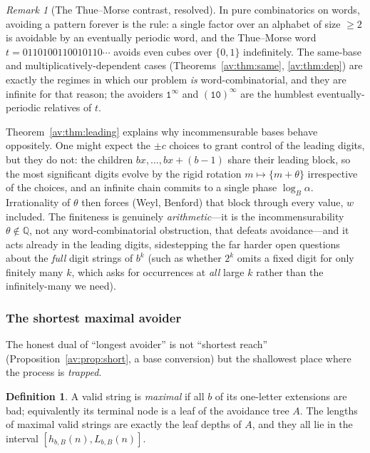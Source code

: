 \documentclass[a4paper]{article}
\theoremstyle{plain}
\theoremstyle{definition}
\newtheorem{definition}{Definition}[subsection]
\theoremstyle{remark}
\newtheorem{remark}{Remark}[subsection]
\newcommand{\QQ}{\mathbb{Q}}
\newcommand{\Lbb}[1][b,B]{L_{#1}}
\newcommand{\hbb}[1][b,B]{h_{#1}}
\begin{document}
\begin{remark}[The Thue--Morse contrast, resolved]
In pure combinatorics on words, avoiding a pattern forever is the rule: a single factor over an alphabet of size $\ge2$ is avoidable by an eventually periodic word, and the Thue--Morse word $t=0110100110010110\cdots$ avoids even cubes over $\{0,1\}$ indefinitely. The same-base and multiplicatively-dependent cases (Theorems~\ref{av:thm:same}, \ref{av:thm:dep}) are exactly the regimes in which our problem \emph{is} word-combinatorial, and they are infinite for that reason; the avoiders $\texttt{1}^{\infty}$ and $(\texttt{10})^{\infty}$ are the humblest eventually-periodic relatives of $t$.

Theorem~\ref{av:thm:leading} explains why incommensurable bases behave oppositely. One might expect the $\pm c$ choices to grant control of the leading digits, but they do not: the children $bx,\dots,bx+(b-1)$ share their leading block, so the most significant digits evolve by the rigid rotation $m\mapsto\{m+\theta\}$ irrespective of the choices, and an infinite chain commits to a single phase $\log_B\alpha$. Irrationality of $\theta$ then forces (Weyl, Benford) that block through every value, $w$ included. The finiteness is genuinely \emph{arithmetic}---it is the incommensurability $\theta\notin\QQ$, not any word-combinatorial obstruction, that defeats avoidance---and it acts already in the leading digits, sidestepping the far harder open questions about the \emph{full} digit strings of $b^{k}$ (such as whether $2^{k}$ omits a fixed digit for only finitely many $k$, which asks for occurrences at \emph{all} large $k$ rather than the infinitely-many we need).
\end{remark}

\subsubsection{The shortest maximal avoider}\label{av:sec:dual}

The honest dual of ``longest avoider'' is not ``shortest reach'' (Proposition~\ref{av:prop:short}, a base conversion) but the shallowest place where the process is \emph{trapped}.

\begin{definition}
A valid string is \emph{maximal} if all $b$ of its one-letter extensions are bad; equivalently its terminal node is a leaf of the avoidance tree $A$. The lengths of maximal valid strings are exactly the leaf depths of $A$, and they all lie in the interval $[\hbb(n),\Lbb(n)]$.
\end{definition}
\end{document}
